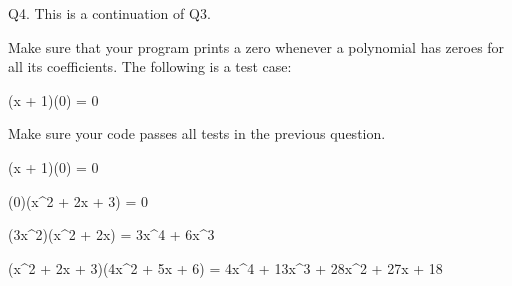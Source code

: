 Q4. This is a continuation of Q3.

Make sure that your program prints a zero whenever a polynomial has zeroes for all its coefficients. 
The following is a test case:
\begin{console}[commandchars=\\\{\}]
(x + 1)(0) = 0
\end{console}

Make sure your code passes all tests in the previous question.

\resett
\nextt
\begin{console}[commandchars=\\\{\}]
(x + 1)(0) = 0
\end{console}

\nextt
\begin{console}[commandchars=\\\{\}]
(0)(x^2 + 2x + 3) = 0
\end{console}

\nextt
\begin{console}[commandchars=\\\{\}]
(3x^2)(x^2 + 2x) = 3x^4 + 6x^3
\end{console}

\nextt
\begin{console}[commandchars=\\\{\}]
(x^2 + 2x + 3)(4x^2 + 5x + 6) = 4x^4 + 13x^3 + 28x^2 + 27x + 18
\end{console}
